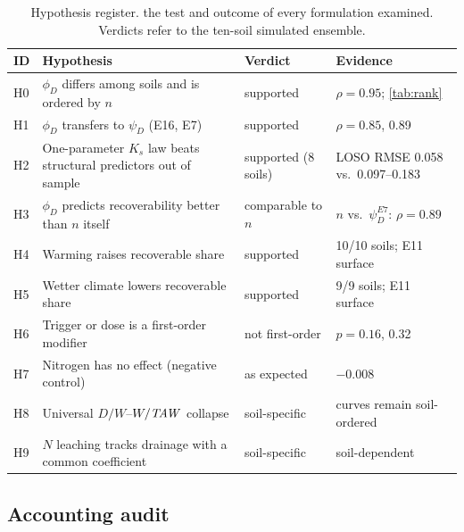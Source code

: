 \begin{table}[H]\centering\small
\caption{Hypothesis register. the test and outcome of every formulation examined. Verdicts refer to the ten-soil simulated ensemble.}
\label{tab:hyp}
\begin{tabularx}{\textwidth}{lXlX}
\toprule
ID & Hypothesis & Verdict & Evidence\\\midrule
H0 & $\phi_D$ differs among soils and is ordered by $n$ & supported & $\rho=0.95$; \cref{tab:rank}\\
H1 & $\phi_D$ transfers to $\psi_D$ (E16, E7) & supported & $\rho=0.85$, 0.89\\
H2 & One-parameter $K_s$ law beats structural predictors out of sample & supported (8 soils) & LOSO RMSE 0.058 vs.\ 0.097--0.183\\
H3 & $\phi_D$ predicts recoverability better than $n$ itself & comparable to $n$ & $n$ vs.\ $\psi_D^{E7}$: $\rho=0.89$\\
H4 & Warming raises recoverable share & supported & 10/10 soils; E11 surface\\
H5 & Wetter climate lowers recoverable share & supported & 9/9 soils; E11 surface\\
H6 & Trigger or dose is a first-order modifier & not first-order & $p=0.16$, 0.32\\
H7 & Nitrogen has no effect (negative control) & as expected & $-0.008$\\
H8 & Universal $D/W$--$W/\mathit{TAW}$ collapse & soil-specific & curves remain soil-ordered\\
H9 & $N$ leaching tracks drainage with a common coefficient & soil-specific & soil-dependent\\\bottomrule
\end{tabularx}
\end{table}

\subsection{Accounting audit}
\label{sec:resultsB}
